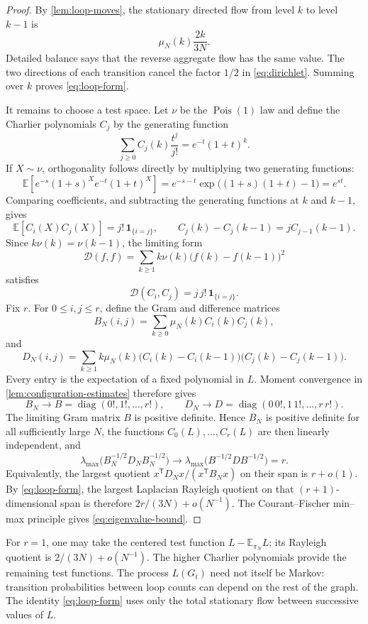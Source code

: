 \documentclass[11pt]{article}
\newcommand{\E}{\mathbb E}
\newcommand{\Pois}{\operatorname{Pois}}
\theoremstyle{plain}
\theoremstyle{definition}
\numberwithin{equation}{section}
\begin{document}
\begin{proof}
By \cref{lem:loop-moves}, the stationary directed flow from level $k$ to level
$k-1$ is
\[
  \mu_N(k)\frac{2k}{3N}.
\]
Detailed balance says that the reverse aggregate flow has the same value.
The two directions of each transition cancel the factor $1/2$ in
\eqref{eq:dirichlet}.  Summing over $k$ proves \eqref{eq:loop-form}.

It remains to choose a test space.  Let $\nu$ be the $\Pois(1)$ law and define
the Charlier polynomials $C_j$ by the generating function
\cite{KoekoekLeskySwarttouw2010}
\begin{equation}\label{eq:charlier}
  \sum_{j\geq0}C_j(k)\frac{t^j}{j!}=e^{-t}(1+t)^k.
\end{equation}
If $X\sim\nu$, orthogonality follows directly by multiplying two generating
functions:
\[
 \E\!\left[e^{-s}(1+s)^X e^{-t}(1+t)^X\right]
 =e^{-s-t}\exp\bigl((1+s)(1+t)-1\bigr)=e^{st}.
\]
Comparing coefficients, and subtracting the generating functions at $k$ and
$k-1$, gives
\[
  \E[C_i(X)C_j(X)]=j!\,\mathbf 1_{\{i=j\}},
  \qquad
  C_j(k)-C_j(k-1)=jC_{j-1}(k-1).
\]
Since $k\nu(k)=\nu(k-1)$, the limiting form
\[
  \mathcal D(f,f)=\sum_{k\geq1}k\nu(k)
      \bigl(f(k)-f(k-1)\bigr)^2
\]
satisfies
\[
  \mathcal D(C_i,C_j)=j\,j!\,\mathbf 1_{\{i=j\}}.
\]
Fix $r$.  For $0\leq i,j\leq r$, define the Gram and difference matrices
\[
 B_N(i,j)=\sum_{k\geq0}\mu_N(k)C_i(k)C_j(k),
\]
and
\[
 D_N(i,j)=\sum_{k\geq1}k\mu_N(k)
   \bigl(C_i(k)-C_i(k-1)\bigr)
   \bigl(C_j(k)-C_j(k-1)\bigr).
\]
Every entry is the expectation of a fixed polynomial in $L$.  Moment
convergence in \cref{lem:configuration-estimates} therefore gives
\[
 B_N\longrightarrow B=\operatorname{diag}(0!,1!,\ldots,r!),
 \qquad
 D_N\longrightarrow D=\operatorname{diag}(0\,0!,1\,1!,\ldots,r\,r!).
\]
The limiting Gram matrix $B$ is positive definite.  Hence $B_N$ is positive
definite for all sufficiently large $N$, the functions
$C_0(L),\ldots,C_r(L)$ are then linearly independent, and
\[
 \lambda_{\max}\bigl(B_N^{-1/2}D_NB_N^{-1/2}\bigr)
 \longrightarrow
 \lambda_{\max}\bigl(B^{-1/2}DB^{-1/2}\bigr)=r.
\]
Equivalently, the largest quotient $x^{\mathsf T}D_Nx/(x^{\mathsf T}B_Nx)$
on their span is $r+o(1)$.  By \eqref{eq:loop-form}, the largest Laplacian
Rayleigh quotient on that $(r+1)$-dimensional span is therefore
$2r/(3N)+o(N^{-1})$.  The Courant--Fischer min--max principle gives
\eqref{eq:eigenvalue-bound}.
\end{proof}

For $r=1$, one may take the centered test function $L-\E_{\pi_N}L$; its
Rayleigh quotient is $2/(3N)+o(N^{-1})$.  The higher Charlier polynomials
provide the remaining test functions.  The process $L(G_t)$ need not itself
be Markov: transition probabilities between loop counts can depend on the
rest of the graph.  The identity \eqref{eq:loop-form} uses only the total
stationary flow between successive values of $L$.
\end{document}
